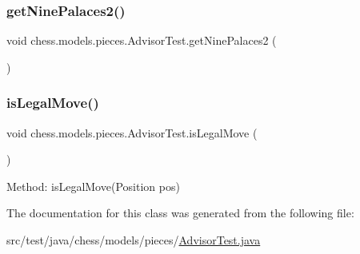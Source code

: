 \subsubsection{\texorpdfstring{get\+Nine\+Palaces2()}{getNinePalaces2()}}
{\footnotesize\ttfamily void chess.\+models.\+pieces.\+Advisor\+Test.\+get\+Nine\+Palaces2 (\begin{DoxyParamCaption}{ }\end{DoxyParamCaption})}

\mbox{\label{classchess_1_1models_1_1pieces_1_1_advisor_test_a865ff283ac107e64d2d27044ff25d02e}} 
\subsubsection{\texorpdfstring{is\+Legal\+Move()}{isLegalMove()}}
{\footnotesize\ttfamily void chess.\+models.\+pieces.\+Advisor\+Test.\+is\+Legal\+Move (\begin{DoxyParamCaption}{ }\end{DoxyParamCaption})}

Method\+: is\+Legal\+Move(\+Position pos) 

The documentation for this class was generated from the following file\+:\begin{DoxyCompactItemize}
\item 
src/test/java/chess/models/pieces/\mbox{\hyperlink{_advisor_test_8java}{Advisor\+Test.\+java}}\end{DoxyCompactItemize}
